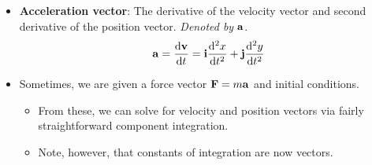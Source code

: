 \documentclass[../main.tex]{subfiles}
\begin{document}
\begin{itemize}
\begin{figure}[H]
        \caption{Velocity vector.}
        \label{fig:velocityVector}
    \end{figure}
    \begin{itemize}
        \item \textcite{bib:Thomas} semi-rigorously proves from Figure \ref{fig:velocityVector} that if $\vb{R}$ is the position vector, then $\dv*{\vb{R}}{t}$ is the velocity vector.
        \item Essentially, he proves that
        \begin{equation*}
            \dv{\vb{R}}{t} = \vb{i}\dv{x}{t}+\vb{j}\dv{y}{t}
        \end{equation*}
        It follows from this that
        \begin{align*}
            \text{slope of }\dv{\vb{R}}{t} &= \frac{\vb{j}\text{-component}}{\vb{i}\text{-component}}
            = \frac{\dv*{y}{t}}{\dv*{x}{t}}
            = \dv{y}{x}\\
            \left| \dv{R}{t} \right| &= \left| \vb{i}\dv{x}{t}+\vb{j}\dv{y}{t} \right|
            = \sqrt{\left( \dv{x}{t} \right)^2+\left( \dv{y}{t} \right)^2}
            = \left| \dv{s}{t} \right|
        \end{align*}
    \end{itemize}
    \item \textbf{Acceleration vector}: The derivative of the velocity vector and second derivative of the position vector. \emph{Denoted by} $\vb{a}$.
    \begin{equation*}
        \vb{a} = \dv{\vb{v}}{t} = \vb{i}\dv[2]{x}{t}+\vb{j}\dv[2]{y}{t}
    \end{equation*}
    \item Sometimes, we are given a force vector $\vb{F}=m\vb{a}$ and initial conditions.
    \begin{itemize}
        \item From these, we can solve for velocity and position vectors via fairly straightforward component integration.
        \item Note, however, that constants of integration are now vectors.
    \end{itemize}
\end{itemize}
\end{document}
